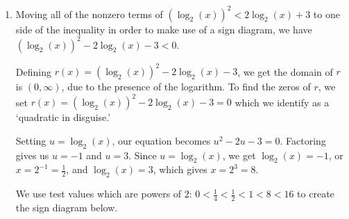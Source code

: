 \documentclass{ximera}
\begin{document}
\begin{example}
\begin{explanation}
\begin{enumerate}
\begin{image}
% 
\end{image}

From our sign diagram, we find $r(x) \geq 0$ on $\left(0, \frac{1}{e}\right) \cup [1, \infty)$, which is our solution. 


Graphing $f(x) =  \frac{1}{\ln(x)+1}$ and $g(x) = 1$ using desmos, we see the graph of $f$ is below the graph of $g$ on these intervals, and that the graphs intersect at $x=1$.

\begin{center}
\end{center}

\item  Moving all of the nonzero terms of  $\left(\log_{2}(x)\right)^2 < 2 \log_{2}(x) + 3$ to one side of the inequality in order to make use of a sign diagram, we have $\left(\log_{2}(x)\right)^2 - 2 \log_{2}(x) - 3 < 0$. 

Defining $r(x) = \left(\log_{2}(x)\right)^2 - 2 \log_{2}(x) - 3$, we get the domain of $r$ is $(0, \infty)$, due to the presence of the logarithm.  To find the zeros of $r$, we set $r(x) =\left(\log_{2}(x)\right)^2 - 2 \log_{2}(x) - 3= 0$ which we identify as a  `quadratic in disguise.'  

Setting $u = \log_{2}(x)$, our equation becomes $u^2-2u-3 = 0$.  Factoring   gives us $u=-1$ and $u=3$.  Since $u = \log_{2}(x)$, we get $\log_{2}(x) = -1$, or $x = 2^{-1} = \frac{1}{2}$, and $\log_{2}(x) = 3$, which gives  $x = 2^{3} = 8$.  


We use test values which are powers of $2$: $0 < \frac{1}{4} < \frac{1}{2} < 1 < 8 < 16$ to create the sign diagram below. 


\begin{image}
% 
\end{image}



\end{enumerate}
\end{explanation}
\end{example}
\end{document}
